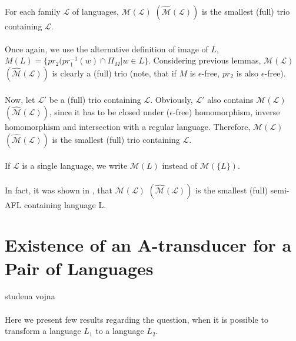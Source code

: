 \paragraph{}
\cveta For each family $\mathcal{L} $ of languages, $\mathcal{M(L)} $ $(\mathcal{\hat{M}(L)}) $ is the smallest (full) trio containing $\mathcal{L} $.

\paragraph{}
\dokaz Once again, we use the alternative definition of image of $L$, $M(L) = \{ pr_{2}(pr_{1}^{-1}(w) \cap \Pi_{M} | w \in L \}$. Considering previous lemmas, $\mathcal{M(L)} $ $(\mathcal{\hat{M}(L)}) $ is clearly a (full) trio (note, that if $M$ is $\epsilon $-free, $pr_{2}$ is also $\epsilon $-free).

\paragraph{}
Now, let $\mathcal{L'} $ be a (full) trio containing $\mathcal{L} $. Obviously, $\mathcal{L'} $ also contains $\mathcal{M(L)} $ $(\mathcal{\hat{M}(L)}) $, since it has to be closed under ($\epsilon $-free) homomorphism, inverse homomorphism and intersection with a regular language. Therefore, $\mathcal{M(L)} $ $(\mathcal{\hat{M}(L)}) $ is the smallest (full) trio containing $\mathcal{L} $. \square

\paragraph{}
\oznacenie If $\mathcal{L}$ is a single language, we write $\mathcal{M}(L)$ instead of $\mathcal{M}(\{ L\} )$.

\paragraph{}
In fact, it was shown in \cite{gingrei:pAFL}, that $\mathcal{M(L)} $ $(\mathcal{\hat{M}(L)}) $ is the smallest (full) semi-AFL containing language L.

\section{Existence of an A-transducer for a Pair of Languages}studena vojna
\paragraph{}
Here we present few results regarding the question, when it is possible to transform a language $L_{1}$ to a language $L_{2}$.

